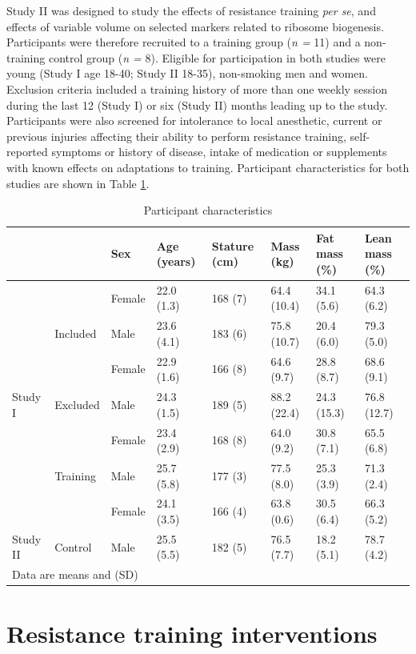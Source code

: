 \documentclass[twoside,10pt]{gihclass} %
\begin{document}
Study II was designed to study the effects of resistance training \emph{per
se}, and effects of variable volume on selected markers related to
ribosome biogenesis. Participants were therefore recruited to a training
group (\emph{n =} 11) and a non-training control group (\emph{n =} 8). Eligible
for participation in both studies were young (Study I age 18-40; Study
II 18-35), non-smoking men and women. Exclusion criteria included a
training history of more than one weekly session during the last 12
(Study I) or six (Study II) months leading up to the study. Participants
were also screened for intolerance to local anesthetic, current or
previous injuries affecting their ability to perform resistance
training, self-reported symptoms or history of disease, intake of
medication or supplements with known effects on adaptations to training.
Participant characteristics for both studies are shown in Table
\ref{tab:characteristics-table}.
\begin{table}

\caption{\label{tab:characteristics-table}Participant characteristics}
\centering
\fontsize{7}{9}\selectfont
\begin{tabular}[t]{llllllll}
\toprule
  &   & Sex & Age (years) & Stature
(cm) & Mass (kg) & Fat mass (\%) & Lean mass (\%)\\
\midrule
 &  & Female & 22.0 (1.3) & 168 (7) & 64.4 (10.4) & 34.1 (5.6) & 64.3 (6.2)\\
\cmidrule{3-8}
 & \multirow{-2}{*}{\raggedright\arraybackslash Included} & Male & 23.6 (4.1) & 183 (6) & 75.8 (10.7) & 20.4 (6.0) & 79.3 (5.0)\\
\cmidrule{2-8}
 &  & Female & 22.9 (1.6) & 166 (8) & 64.6 (9.7) & 28.8 (8.7) & 68.6 (9.1)\\
\cmidrule{3-8}
\multirow{-4}{*}{\raggedright\arraybackslash Study I} & \multirow{-2}{*}{\raggedright\arraybackslash Excluded} & Male & 24.3 (1.5) & 189 (5) & 88.2 (22.4) & 24.3 (15.3) & 76.8 (12.7)\\
\cmidrule{1-8}
 &  & Female & 23.4 (2.9) & 168 (8) & 64.0 (9.2) & 30.8 (7.1) & 65.5 (6.8)\\
\cmidrule{3-8}
 & \multirow{-2}{*}{\raggedright\arraybackslash Training} & Male & 25.7 (5.8) & 177 (3) & 77.5 (8.0) & 25.3 (3.9) & 71.3 (2.4)\\
\cmidrule{2-8}
 &  & Female & 24.1 (3.5) & 166 (4) & 63.8 (0.6) & 30.5 (6.4) & 66.3 (5.2)\\
\cmidrule{3-8}
\multirow{-4}{*}{\raggedright\arraybackslash Study II} & \multirow{-2}{*}{\raggedright\arraybackslash Control} & Male & 25.5 (5.5) & 182 (5) & 76.5 (7.7) & 18.2 (5.1) & 78.7 (4.2)\\
\bottomrule
\multicolumn{8}{l}{\rule{0pt}{1em}Data are means and (SD)}\\
\end{tabular}
\end{table}
\hypertarget{resistance-training-interventions}{%
\section{Resistance training interventions}\label{resistance-training-interventions}}
\end{document}
